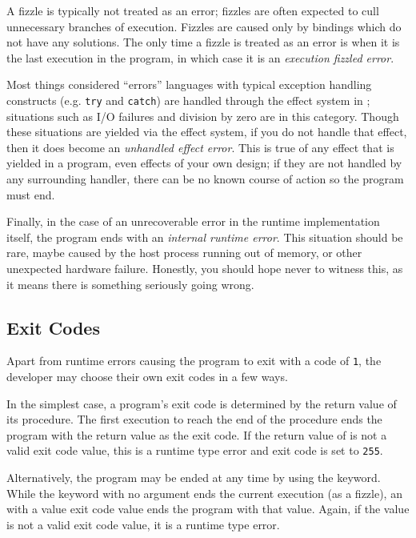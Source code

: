 A fizzle is typically not treated as an error; fizzles are often expected
to cull unnecessary branches of execution. Fizzles are caused only by bindings
which do not have any solutions. The only time a fizzle is treated as an error
is when it is the last execution in the program, in which case it is an \emph{execution
fizzled error}.

Most things considered ``errors'' languages with typical exception
handling constructs (e.g. \texttt{try} and \texttt{catch}) are handled through
the effect system in \Trilogy{}; situations such as I/O failures and division by
zero are in this category. Though these situations are yielded via the effect
system, if you do not handle that effect, then it does become an
\emph{unhandled effect error}. This is true of any effect that is yielded in
a program, even effects of your own design; if they are not handled by any
surrounding handler, there can be no known course of action so the program
must end.

Finally, in the case of an unrecoverable error in the runtime implementation
itself, the program ends with an \emph{internal runtime error}. This situation
should be rare, maybe caused by the host process running out of memory, or
other unexpected hardware failure. Honestly, you should hope never to witness
this, as it means there is something seriously going wrong.

\subsection{Exit Codes}
\label{sec:exitcode}

Apart from runtime errors causing the program to exit with a code of \texttt{1},
the developer may choose their own exit codes in a few ways.

In the simplest case, a \Trilogy{} program's exit code is determined by the
return value of its  procedure. The first execution to reach the end
of the  procedure ends the program with the return value as the exit
code. If the return value of  is not a valid exit code value, this
is a runtime type error and exit code is set to \texttt{255}.

Alternatively, the program may be ended at any time by using the  keyword.
While the  keyword with no argument ends the current execution (as a fizzle),
an  with a value exit code value ends the program with that value. Again, if
the value is not a valid exit code value, it is a runtime type error.

